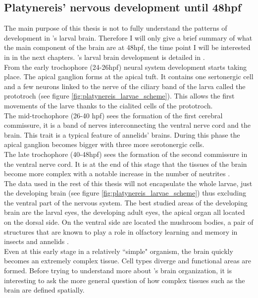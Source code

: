      \subsection{Platynereis' nervous development until 48hpf}
     The main purpose of this thesis is not to fully understand the patterns of development in \platy{}'s larval brain. Therefore I will only give a brief summary of what the main component of the brain are at 48hpf, the time point I will be interested in in the next chapters. \platy{}'s larval brain development is detailed in \cite{Fischer10}.\\
     From the early trochophore (24-26hpf) neural system development starts taking place. The apical ganglion forms at the apical tuft. It contains one sertonergic cell and a few neurons linked to the nerve of the ciliary band of the larva called the prototroch (see figure \ref{fig:platynereis_larvae_scheme}). This allows the first movements of the larve thanks to the cialited cells of the prototroch.\\
     The mid-trochophore (26-40 hpf) sees the formation of the first cerebral commissure, it is a band of nerves interconnecting the ventral nerve cord and the brain. This trait is a typical feature of annelids' brains. During this phase the apical ganglion becomes bigger with three more serotonergic cells.\\
     The late trochophore (40-48hpf) sees the formation of the second commissure in the ventral nerve cord. It is at the end of this stage that the tissues of the brain become more complex with a notable increase in the number of neutrites \cite{Fischer10}.\\
     The data used in the rest of this thesis will not encapsulate the whole larvae, just the developing brain (see figure \ref{fig:platynereis_larvae_scheme}) thus excluding the ventral part of the nervous system. The best studied areas of the developing brain are the larval eyes, the developing adult eyes, the apical organ all located on the dorsal side. On the ventral side are located the mushroom bodies, a pair of structures that are known to play a role in olfactory learning and memory in insects and annelids \cite{Tomer10}.\\
     
     Even at this early stage in a relatively ``simple" organism, the brain quickly becomes an extremely complex tissue. Cell types diverge and functional areas are formed. Before trying to understand more about \platy{}'s brain organization, it is interesting to ask the more general question of how complex tissues such as the brain are defined spatially.
     
